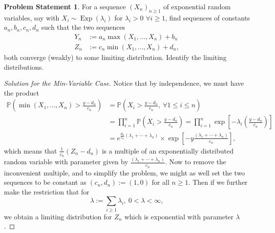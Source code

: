 \documentclass[12pt,reqno]{article}
\theoremstyle{plain}
\theoremstyle{definition}
\newtheorem{problem}[theorem]{Problem Statement}
\newcommand{\PP}[1]{\ensuremath{\mathbb{P}\left(#1\right)}}
\begin{document}
\begin{problem}
For a sequence $(X_n)_{n \geq 1}$ of exponential random variables, say with 
$X_i \sim \operatorname{Exp}(\lambda_i)$ for $\lambda_i > 0$ 
$\forall i \geq 1$, find sequences of constants $a_n,b_n,c_n,d_n$ such that 
the two sequences 
\begin{align*} 
Y_n & := a_n \max(X_1,\ldots,X_n) + b_n \\ 
Z_n & := c_n \min(X_1,\ldots,X_n) + d_n, 
\end{align*} 
both converge (weakly) to some limiting distribution. Identify the 
limiting distributions. 
\end{problem} 
\begin{proof}[Solution for the Min-Variable Case]
Notice that by independence, we must have the product 
\begin{align*} 
\PP{\min(X_1,\ldots,X_n) > \frac{y-d_n}{c_n}} & = 
     \PP{X_i  > \frac{y-d_n}{c_n},\ \forall 1 \leq i \leq n} \\ 
     & = \prod_{i=1}^n \PP{X_i > \frac{y-d_n}{c_n}} = 
     \prod_{i=1}^n \exp\left[-\lambda_i\left(\frac{y-d_n}{c_n}\right) 
     \right] \\ 
     & = e^{\frac{d_n}{c_n}(\lambda_1+\cdots+\lambda_n)} \times 
     \exp\left[-y \frac{(\lambda_1+\cdots+\lambda_n)}{c_n}\right], 
\end{align*} 
which means that $\frac{1}{c_n}(Z_n-d_n)$ is a multiple of an 
exponentially distributed random variable with parameter given by 
$\frac{(\lambda_1+\cdots+\lambda_n)}{c_n}$. Now to remove the inconvenient 
multiple, and to simplify the problem, we might as well set the two 
sequences to be constant as $(c_n, d_n) := (1, 0)$ for all $n \geq 1$. 
Then if we further make the restriction that for 
\[
\lambda := \sum_{i \geq 1} \lambda_i,\ 0 < \lambda < \infty, 
\]
we obtain a limiting distribution for $Z_n$ which is exponential with 
parameter $\lambda$. 
\end{proof} 
\end{document}
